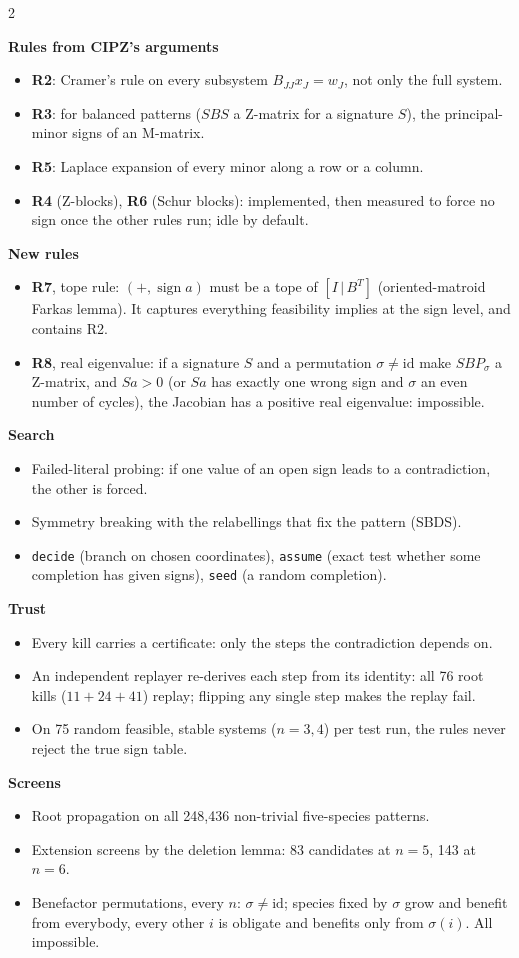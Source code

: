 \documentclass[10pt]{article}
\newcommand{\sect}[1]{\par\vspace{3pt}{\large\bfseries\color{black!80}#1}\par\vspace{1pt}}
\newcommand{\R}[1]{\textsf{\textbf{#1}}}
\newcommand{\sub}[1]{\par\vspace{1pt}\textbf{#1}\par}
\begin{document}
\begin{multicols}{2}
\sect{2. Methods added}
\sub{Rules from CIPZ's arguments}
\begin{itemize}
  \item \R{R2}: Cramer's rule on every subsystem $B_{JJ}x_J=w_J$, not only the full system.
  \item \R{R3}: for balanced patterns ($SBS$ a Z-matrix for a signature $S$), the principal-minor signs of
    an M-matrix.
  \item \R{R5}: Laplace expansion of every minor along a row or a column.
  \item \R{R4} (Z-blocks), \R{R6} (Schur blocks): implemented, then measured to force no sign once the
    other rules run; idle by default.
\end{itemize}
\sub{New rules}
\begin{itemize}
  \item \R{R7}, tope rule: $(+,\operatorname{sign}a)$ must be a tope of $[I\,|\,B^{T}]$ (oriented-matroid
    Farkas lemma). It captures everything feasibility implies at the sign level, and contains R2.
  \item \R{R8}, real eigenvalue: if a signature $S$ and a permutation $\sigma\neq\mathrm{id}$ make
    $SBP_\sigma$ a Z-matrix, and $Sa>0$ (or $Sa$ has exactly one wrong sign and $\sigma$ an even number of
    cycles), the Jacobian has a positive real eigenvalue: impossible.
\end{itemize}
\sub{Search}
\begin{itemize}
  \item Failed-literal probing: if one value of an open sign leads to a contradiction, the other is forced.
  \item Symmetry breaking with the relabellings that fix the pattern (SBDS).
  \item \texttt{decide} (branch on chosen coordinates), \texttt{assume} (exact test whether some completion
    has given signs), \texttt{seed} (a random completion).
\end{itemize}
\sub{Trust}
\begin{itemize}
  \item Every kill carries a certificate: only the steps the contradiction depends on.
  \item An independent replayer re-derives each step from its identity: all 76 root kills
    ($11+24+41$) replay; flipping any single step makes the replay fail.
  \item On 75 random feasible, stable systems ($n=3,4$) per test run, the rules never reject the true
    sign table.
\end{itemize}
\sub{Screens}
\begin{itemize}
  \item Root propagation on all 248{,}436 non-trivial five-species patterns.
  \item Extension screens by the deletion lemma: 83 candidates at $n=5$, 143 at $n=6$.
  \item Benefactor permutations, every $n$: $\sigma\neq\mathrm{id}$; species fixed by $\sigma$ grow and
    benefit from everybody, every other $i$ is obligate and benefits only from $\sigma(i)$. All impossible.
\end{itemize}


\end{multicols}
\end{document}
